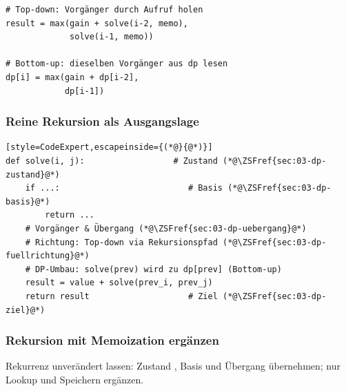 \begin{codebox}
\begin{lstlisting}[style=CodeExpert]
# Top-down: Vorgänger durch Aufruf holen
result = max(gain + solve(i-2, memo),
             solve(i-1, memo))

# Bottom-up: dieselben Vorgänger aus dp lesen
dp[i] = max(gain + dp[i-2],
            dp[i-1])
\end{lstlisting}
\end{codebox}

\subsubsection{Reine Rekursion als Ausgangslage}\label{sec:03-dp-reine-rekursion}
\begin{codebox}
\begin{lstlisting}[style=CodeExpert,escapeinside={(*@}{@*)}]
def solve(i, j):                  # Zustand (*@\ZSFref{sec:03-dp-zustand}@*)
    if ...:                          # Basis (*@\ZSFref{sec:03-dp-basis}@*)
        return ...
    # Vorgänger & Übergang (*@\ZSFref{sec:03-dp-uebergang}@*)
    # Richtung: Top-down via Rekursionspfad (*@\ZSFref{sec:03-dp-fuellrichtung}@*)
    # DP-Umbau: solve(prev) wird zu dp[prev] (Bottom-up)
    result = value + solve(prev_i, prev_j)
    return result                    # Ziel (*@\ZSFref{sec:03-dp-ziel}@*)
\end{lstlisting}
\end{codebox}

\ZSFmanualColumnBreak
\subsubsection{Rekursion mit Memoization ergänzen}\label{sec:03-dp-memoization}

Rekurrenz unverändert lassen: Zustand , Basis  und Übergang  übernehmen; nur Lookup und Speichern ergänzen.

